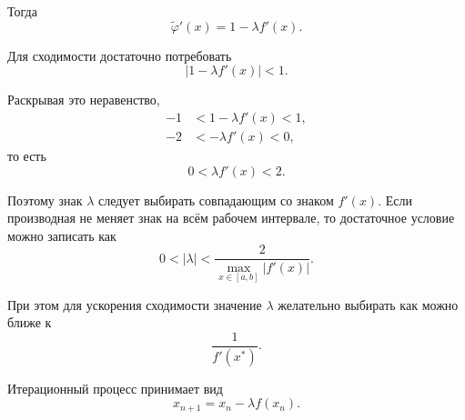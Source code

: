 \documentclass[../final.tex]{subfiles}
\begin{document}
Тогда
%
\begin{equation*}
    \widetilde\varphi'(x)
    =
    1-\lambda f'(x).
\end{equation*}

Для сходимости достаточно потребовать
%
\begin{equation*}
    |1-\lambda f'(x)|<1.
\end{equation*}

Раскрывая это неравенство,
%
\begin{align*}
    -1
    &<
    1-\lambda f'(x)
    <
    1,
    \\
    -2
    &<
    -\lambda f'(x)
    <
    0,
\end{align*}
%
то есть
%
\begin{equation*}
    0<\lambda f'(x)<2.
\end{equation*}

Поэтому знак $\lambda$ следует выбирать совпадающим со знаком
$f'(x)$. Если производная не меняет знак на всём рабочем интервале,
то достаточное условие можно записать как
%
\begin{equation*}
    0<|\lambda|
    <
    \frac{2}
    {\displaystyle\max_{x\in[a,b]}|f'(x)|}.
\end{equation*}

При этом для ускорения сходимости значение $\lambda$ желательно
выбирать как можно ближе к
%
\begin{equation*}
    \frac{1}{f'(x^*)}.
\end{equation*}

Итерационный процесс принимает вид
%
\begin{equation*}
    x_{n+1}
    =
    x_n-\lambda f(x_n).
\end{equation*}
\end{document}
